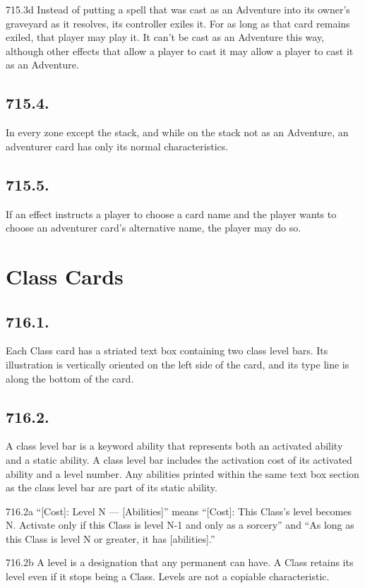 715.3d Instead of putting a spell that was cast as an Adventure into its owner’s graveyard as it resolves, its controller exiles it. For as long as that card remains exiled, that player may play it. It can’t be cast as an Adventure this way, although other effects that allow a player to cast it may allow a player to cast it as an Adventure.

\subsection*{715.4.}
In every zone except the stack, and while on the stack not as an Adventure, an adventurer card has only its normal characteristics.

\subsection*{715.5.}
If an effect instructs a player to choose a card name and the player wants to choose an adventurer card’s alternative name, the player may do so.

\section{Class Cards}
\subsection*{716.1.}
Each Class card has a striated text box containing two class level bars. Its illustration is vertically oriented on the left side of the card, and its type line is along the bottom of the card.

\subsection*{716.2.}
A class level bar is a keyword ability that represents both an activated ability and a static ability. A class level bar includes the activation cost of its activated ability and a level number. Any abilities printed within the same text box section as the class level bar are part of its static ability.

716.2a “[Cost]: Level N — [Abilities]” means “[Cost]: This Class’s level becomes N. Activate only if this Class is level N-1 and only as a sorcery” and “As long as this Class is level N or greater, it has [abilities].”

716.2b A level is a designation that any permanent can have. A Class retains its level even if it stops being a Class. Levels are not a copiable characteristic.


